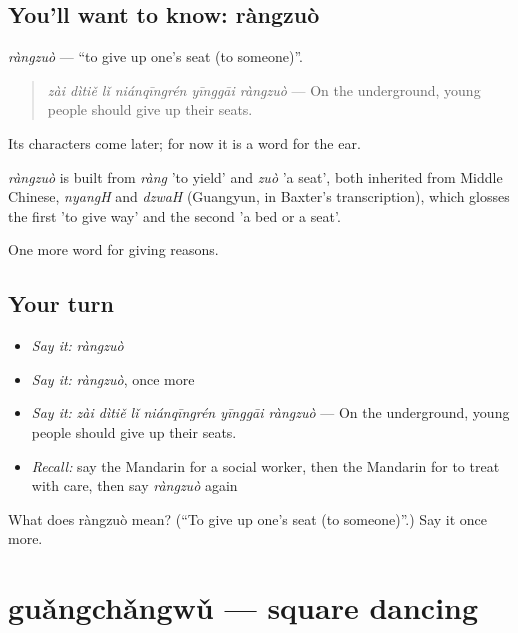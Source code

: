 \subsection*{You'll want to know: ràngzuò}
\emph{ràngzuò} — \textquotedblleft{}to give up one's seat (to someone)\textquotedblright{}.

\begin{quote}
\emph{zài dìtiě lǐ niánqīngrén yīnggāi ràngzuò} — On the underground, young people should give up their seats.
\end{quote}

Its characters come later; for now it is a word for the ear.

\begin{cousinweb}
\emph{ràngzuò} is built from \emph{ràng} 'to yield' and \emph{zuò} 'a seat', both inherited from Middle Chinese, \emph{nyangH} and \emph{dzwaH} (Guangyun, in Baxter's transcription), which glosses the first 'to give way' and the second 'a bed or a seat'.
\end{cousinweb}

\begin{grammarlens}[title={What you've built}]
One more word for giving reasons.
\end{grammarlens}

\subsection*{Your turn}
\begin{itemize}
\raggedright
  \item \emph{Say it:} \emph{ràngzuò}
  \item \emph{Say it:} \emph{ràngzuò}, once more
  \item \emph{Say it:} \emph{zài dìtiě lǐ niánqīngrén yīnggāi ràngzuò} — On the underground, young people should give up their seats.
  \item \emph{Recall:} say the Mandarin for a social worker, then the Mandarin for to treat with care, then say \emph{ràngzuò} again
\end{itemize}

\begin{tcolorbox}[breakable,colback=teal!4,colframe=teal!35!black,title={Before you move on}]
What does ràngzuò mean? (\textquotedblleft{}To give up one's seat (to someone)\textquotedblright{}.) Say it once more.
\end{tcolorbox}
\section[guǎngchǎngwǔ]{guǎngchǎngwǔ — square dancing}


